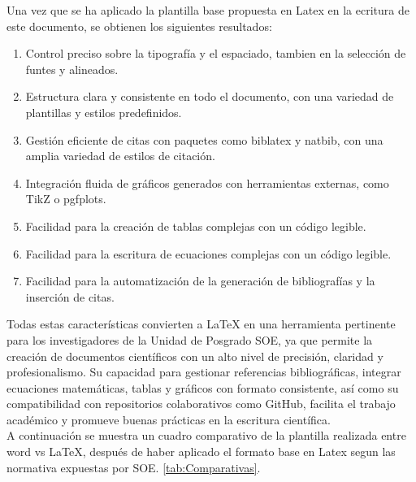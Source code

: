 \documentclass[10pt,twocolumn,a4paper]{article}
\begin{document}
Una vez que se ha aplicado la plantilla base propuesta en Latex en la ecritura de este documento, se obtienen los siguientes resultados:
    \begin{enumerate}
        \item Control preciso sobre la tipografía y el espaciado, tambien en la selección de funtes y alineados.
        \item Estructura clara y consistente en todo el documento, con una variedad de plantillas y estilos predefinidos.
        \item Gestión eficiente de citas con paquetes como biblatex y natbib, con una amplia variedad de estilos de citación.
        \item Integración fluida de gráficos generados con herramientas externas, como TikZ o pgfplots.
        \item Facilidad para la creación de tablas complejas con un código legible.
        \item Facilidad para la escritura de ecuaciones complejas con un código legible.
        \item Facilidad para la automatización de la generación de bibliografías y la inserción de citas.
    \end{enumerate}
    Todas estas características convierten a LaTeX en una herramienta pertinente para los investigadores de la Unidad de Posgrado SOE, ya que permite la creación de documentos científicos con un alto nivel de precisión, claridad y profesionalismo. 
    Su capacidad para gestionar referencias bibliográficas, integrar ecuaciones matemáticas, tablas y gráficos con formato consistente, así como su compatibilidad con repositorios colaborativos como GitHub, facilita el trabajo académico y promueve buenas prácticas en la escritura científica.\\
    A continuación se muestra un cuadro comparativo de la plantilla realizada entre word vs LaTeX, después de haber aplicado el formato base en Latex segun las normativa expuestas por SOE.  \ref{tab:Comparativas}.
\end{document}
